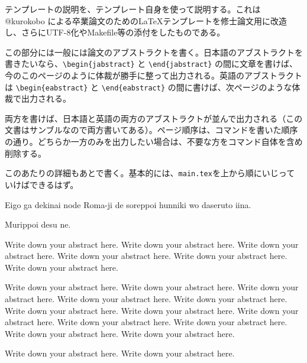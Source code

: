 \begin{jabstract}

テンプレートの説明を、テンプレート自身を使って説明する。これは @kurokobo による卒業論文のための\LaTeX テンプレートを修士論文用に改造し、さらにUTF-8化やMakefile等の添付をしたものである。

この部分には一般には論文のアブストラクトを書く。日本語のアブストラクトを書きたいなら、\verb|\begin{jabstract}| と \verb|\end{jabstract}| の間に文章を書けば、今のこのページのように体裁が勝手に整って出力される。英語のアブストラクトは \verb|\begin{eabstract}| と \verb|\end{eabstract}| の間に書けば、次ページのような体裁で出力される。

両方を書けば、日本語と英語の両方のアブストラクトが並んで出力される（この文書はサンブルなので両方書いてある）。ページ順序は、コマンドを書いた順序の通り。どちらか一方のみを出力したい場合は、不要な方をコマンド自体を含め削除する。

このあたりの詳細もあとで書く。基本的には、{\tt main.tex}を上から順にいじっていけばできるはず。

\end{jabstract}

\begin{eabstract}

Eigo ga dekinai node Roma-ji de soreppoi hunniki wo daseruto iina.

Murippoi desu ne.

Write down your abstract here. Write down your abstract here. Write down your abstract here. Write down your abstract here. Write down your abstract here. Write down your abstract here.

 Write down your abstract here. Write down your abstract here. Write down your abstract here. Write down your abstract here. Write down your abstract here. Write down your abstract here. Write down your abstract here. Write down your abstract here. Write down your abstract here. Write down your abstract here. Write down your abstract here. Write down your abstract here.

Write down your abstract here. Write down your abstract here.

\end{eabstract}

